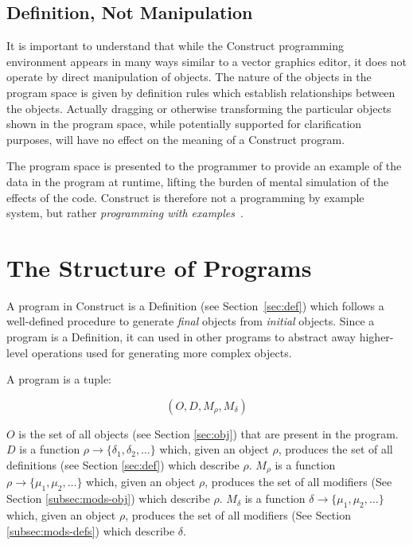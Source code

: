 \documentclass[twoside,openright,11pt]{report}
\begin{document}
\section{Definition, Not Manipulation}
\label{sec:not-manip}

It is important to understand that while the Construct programming environment appears in many ways similar to a vector graphics editor, it does not operate by direct manipulation of objects.
The nature of the objects in the program space is given by definition rules which establish relationships between the objects. 
Actually dragging or otherwise transforming the particular objects shown in the program space, while potentially supported for clarification purposes, will have no effect on the meaning of a Construct program.

The program space is presented to the programmer to provide an example of the data in the program at runtime, lifting the burden of mental simulation of the effects of the code. 
Construct is therefore not a programming by example~\cite{smith1975pygmalion} system, but rather {\it programming with examples}~\cite{myers1986taxonomy}.


\chapter{The Structure of Programs}
\label{chap:struct}

A program in Construct is a Definition (see Section~\ref{sec:def}) which follows a well-defined procedure to generate {\it final} objects from {\it initial} objects. 
Since a program is a Definition, it can used in other programs to abstract away higher-level operations used for generating more complex objects.

A program is a tuple:

$$(O, D, M_\rho, M_\delta)$$

$O$ is the set of all objects (see Section \ref{sec:obj}) that are present in the program. 
$D$ is a function $\rho \to \{\delta_1, \delta_2, \dots\}$ which, given an object $\rho$, produces the set of all definitions (see Section \ref{sec:def}) which describe $\rho$.
$M_\rho$ is a function $\rho \to \{\mu_1, \mu_2, \dots\}$ which, given an object $\rho$, produces the set of all modifiers (See Section \ref{subsec:mods-obj}) which describe $\rho$.
$M_\delta$ is a function $\delta \to \{\mu_1, \mu_2, \dots\}$ which, given an object $\rho$, produces the set of all modifiers (See Section \ref{subsec:mods-defs}) which describe $\delta$.
\end{document}
